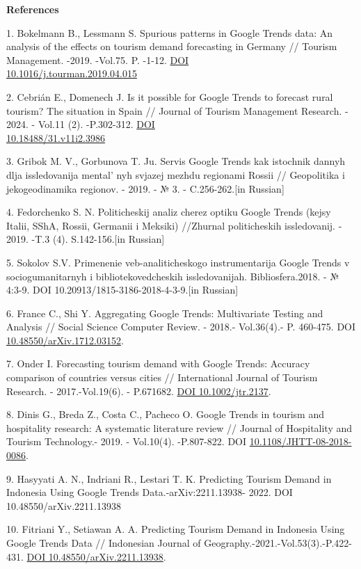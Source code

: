\begin{center}
{\bfseries References}
\end{center}

\begin{references}
1. Bokelmann B., Lessmann S. Spurious patterns in Google Trends data: An
analysis of the effects on tourism demand forecasting in Germany //
Tourism Management. -2019. -Vol.75. P. -1-12.
\href{https://doi.org/10.1016/j.tourman.2019.04.015}{DOI\\
10.1016/j.tourman.2019.04.015}

2. Cebrián E., Domenech J. Is it possible for Google Trends to forecast
rural tourism? The situation in Spain // Journal of Tourism Management
Research. - 2024. - Vol.11 (2). -P.302-312.
\href{https://doi.org/10.18488/31.v11i2.3986}{DOI\\
10.18488/31.v11i2.3986}

3. Gribok M. V., Gorbunova T. Ju. Servis Google Trends kak istochnik
dannyh dlja issledovanija mental' nyh svjazej mezhdu
regionami Rossii // Geopolitika i jekogeodinamika regionov. - 2019. - №
3. - C.256-262.{[}in Russian{]}

4. Fedorchenko S. N. Politicheskij analiz cherez optiku Google Trends
(kejsy Italii, SShA, Rossii, Germanii i Meksiki) //Zhurnal politicheskih
issledovanij. - 2019. -T.3 (4). S.142-156.{[}in Russian{]}

5. Sokolov S.V. Primenenie veb-analiticheskogo instrumentarija Google
Trends v sociogumanitarnyh i bibliotekovedcheskih issledovanijah.
Bibliosfera.2018. - № 4:3-9. DOI 10.20913/1815-3186-2018-4-3-9.{[}in
Russian{]}

6. France C., Shi Y. Aggregating Google Trends: Multivariate Testing and
Analysis // Social Science Computer Review. - 2018.- Vol.36(4).- P.
460-475. DOI
\href{http://dx.doi.org/10.48550/arXiv.1712.03152}{10.48550/arXiv.1712.03152}.

7. Onder I. Forecasting tourism demand with Google Trends: Accuracy
comparison of countries versus cities // International Journal of
Tourism Research. - 2017.-Vol.19(6). - P.671682.
\href{https://doi.org/10.1002/jtr.2137}{DOI 10.1002/jtr.2137}.

8. Dinis G., Breda Z., Costa C., Pacheco O. Google Trends in tourism and
hospitality research: A systematic literature review // Journal of
Hospitality and Tourism Technology.- 2019. - Vol.10(4). -P.807-822.
DOI
\href{http://dx.doi.org/10.1108/JHTT-08-2018-0086}{10.1108/JHTT-08-2018-0086}.

9. Hasyyati A. N., Indriani R., Lestari T. K. Predicting Tourism Demand
in Indonesia Using Google Trends Data.-arXiv:2211.13938- 2022. DOI
10.48550/arXiv.2211.13938

10. Fitriani Y., Setiawan A. A. Predicting Tourism Demand in Indonesia
Using Google Trends Data // Indonesian Journal of
Geography.-2021.-Vol.53(3).-P.422-431.
\href{https://doi.org/10.48550/arXiv.2211.13938}{DOI
10.48550/arXiv.2211.13938}.
\end{references}

